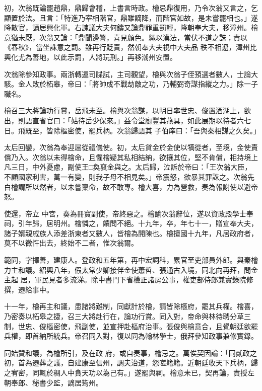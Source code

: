 \begin{pinyinscope}
 初，次翁既論罷趙鼎，鼎歸會稽，上書言時政。檜忌鼎復用，乃令次翁又言之，乞顯置於法。且言：「特進乃宰相階官，鼎雖謫降，而階官如故，是未嘗罷相也。」遂降散官，謫居興化軍。右諫議大夫何鑄又論鼎罪重罰輕，降朝奉大夫，移漳州。檜意猶未厭，次翁又論：「鼎聞邊警，喜見顏色。繩以漢法，當伏不道之誅；責以《春秋》，當坐誅意之罰。雖再行貶責，然朝奉大夫視中大夫品
 秩不相遼，漳州比興化尤為善地，以此示罰，人將玩刑。」再移潮州安置。



 次翁除參知政事。兩浙轉運司牒試，主司觀望，檜與次翁子侄預選者數人，士論大駭。金人敗於柘皋，帝曰：「將帥成不戰劫敵之功，乃輔弼奇謀指縱之力。」除一子職名。



 檜召三大將論功行賞，岳飛未至。檜與次翁謀，以明日率世忠、俊置酒湖上，欲出，則語直省官曰：「姑待岳少保來。」益令堂廚豐其燕具，如此展期以待者六七日。飛既至，皆除樞密使，罷兵柄。次翁歸語其
 子伯庠曰：「吾與秦相謀之久矣。」



 太后回鑾，次翁為奉迎扈從禮儀使。初，太后貸金於金使以犒從者，至境，金使責償乃入。次翁以未得檜命，且懼檜疑其私相結納，欲攘其位，堅不肯償，相持境上凡三日，中外憂慮，副使王□奐裒金與之。太后歸，泣訴於帝曰：「王次翁大臣，不顧國家利害，萬一有變，則我子母不相見矣。」帝震怒，欲暴其罪誅之。次翁先白檜謂所以然者，以未嘗稟命，故不敢專。檜大喜，力為營救，奏為報謝使以避帝怒。



 使還，帝立
 中宮，奏為冊寶副使，帝終惡之。檜諭次翁辭位，遂以資政殿學士奉祠，引年歸，居明州。檜憐之，饋問不絕。十九年，卒，年七十一，贈宣奉大夫，諸子婿親戚族人添差浙東者又數人，皆檜為開陳也。檜擅國十九年，凡居政府者，莫不以微忤出去，終始不二者，惟次翁爾。



 範同，字擇善，建康人。登政和五年第，再中宏詞科，累官至吏部員外郎。與秦檜力主和議。紹興八年，假太常少卿接伴金使蕭哲、張通古入境，同北向再拜，問金主起
 居，軍民見者多流涕。除中書門下省檢正諸房公事，權吏部侍郎兼實錄院修撰，遷給事中。



 十一年，檜再主和議，患諸將難制，同獻計於檜，請皆除樞府，罷其兵權。檜喜，乃密奏以柘皋之捷，召三大將赴行在，論功行賞。同入對，帝命與林待聘分草三制，世忠、俊樞密使，飛副使，並宣押赴樞府治事。張俊與檜意合，且覺朝廷欲罷兵權，即首納所統兵。帝召同入對，復以同為翰林學士，俄拜參知政事兼修實錄。



 同始贊和議，為檜所引，及在政
 府，或自奏事，檜忌之。萬俟契因論：「同貳政之初，首為遷葬之議，自建康至信州，調夫治道，怨嗟籍籍。近朝廷收天下兵柄，歸之宥密，同輒於稠人中貪天功以為己有。」遂罷與祠。檜意未已，契再論，責授左朝奉郎、秘書少監，謫居筠州。




\end{pinyinscope}
